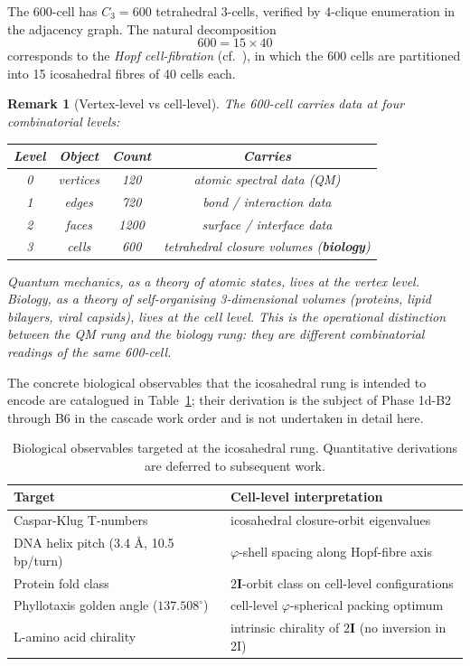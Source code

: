 \documentclass[12pt]{article}
\newtheorem{remark}[theorem]{Remark}
\newcommand{\twoI}{2\mathbf{I}}
\begin{document}
The 600-cell has $C_3 = 600$ tetrahedral 3-cells, verified by 4-clique enumeration in the adjacency graph. The natural decomposition
\[
600 = 15 \times 40
\]
corresponds to the \emph{Hopf cell-fibration} (cf.~\citep{ConwaySloane1999}), in which the 600 cells are partitioned into 15 icosahedral fibres of 40 cells each.

\begin{remark}[Vertex-level vs cell-level]\label{rmk:vertex-cell}
The 600-cell carries data at four combinatorial levels:
\begin{center}
\small
\begin{tabular}{c|c|c|c}
\toprule
Level & Object & Count & Carries \\
\midrule
0 & vertices    & 120  & atomic spectral data (QM) \\
1 & edges       & 720  & bond / interaction data \\
2 & faces       & 1200 & surface / interface data \\
3 & cells       & 600  & tetrahedral closure volumes (\textbf{biology}) \\
\bottomrule
\end{tabular}
\end{center}
Quantum mechanics, as a theory of atomic states, lives at the vertex level. Biology, as a theory of self-organising 3-dimensional volumes (proteins, lipid bilayers, viral capsids), lives at the cell level. This is the operational distinction between the QM rung and the biology rung: \emph{they are different combinatorial readings of the same 600-cell}.
\end{remark}

The concrete biological observables that the icosahedral rung is intended to encode are catalogued in Table~\ref{tab:bio-targets}; their derivation is the subject of Phase 1d-B2 through B6 in the cascade work order and is not undertaken in detail here.

\begin{table}[h]
\centering
\small
\begin{tabular}{l|l}
\toprule
Target & Cell-level interpretation \\
\midrule
Caspar-Klug T-numbers & icosahedral closure-orbit eigenvalues \\
DNA helix pitch (3.4 \AA, 10.5 bp/turn) & $\varphi$-shell spacing along Hopf-fibre axis \\
Protein fold class & $\twoI$-orbit class on cell-level configurations \\
Phyllotaxis golden angle ($137.508^\circ$) & cell-level $\varphi$-spherical packing optimum \\
L-amino acid chirality & intrinsic chirality of $\twoI$ (no inversion in 2I) \\
\bottomrule
\end{tabular}
\caption{Biological observables targeted at the icosahedral rung. Quantitative derivations are deferred to subsequent work.\label{tab:bio-targets}}
\end{table}
\end{document}
